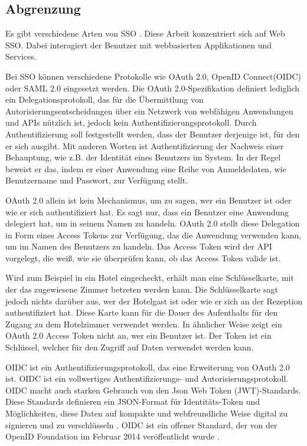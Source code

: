 \subsection{Abgrenzung} \label{EB_Abgrenzung}

Es gibt verschiedene Arten von SSO \cite{EB38}. Diese Arbeit konzentriert sich auf Web SSO. Dabei interagiert der Benutzer mit webbasierten Applikationen und Services.

Bei SSO können verschiedene Protokolle wie OAuth 2.0, OpenID Connect(OIDC) oder SAML 2.0 eingesetzt werden. Die OAuth 2.0-Spezifikation definiert lediglich ein Delegationsprotokoll, das für die Übermittlung von Autorisierungsentscheidungen über ein Netzwerk von webfähigen Anwendungen und APIs nützlich ist, jedoch kein Authentifizierungsprotokoll. Durch Authentifizierung soll festgestellt werden, dass der Benutzer derjenige ist, für den er sich ausgibt. Mit anderen Worten ist Authentifizierung der Nachweis einer Behauptung, wie z.B. der Identität eines Benutzers im System. In der Regel beweist er das, indem er einer Anwendung eine Reihe von Anmeldedaten, wie Benutzername und Passwort, zur Verfügung stellt. \cite{OAuth2inAction} \label{OAuthForAuthentication}

OAuth 2.0 allein ist kein Mechanismus, um zu sagen, wer ein Benutzer ist oder wie er sich authentifiziert hat. Es sagt nur, dass ein Benutzer eine Anwendung delegiert hat, um in seinem Namen zu handeln. OAuth 2.0 stellt diese Delegation in Form eines Access Tokens zur Verfügung, das die Anwendung verwenden kann, um im Namen des Benutzers zu handeln. Das Access Token wird der API vorgelegt, die weiß, wie sie überprüfen kann, ob das Access Token valide ist. \cite{AuthorizationvsAuthentication}

Wird zum Beispiel in ein Hotel eingecheckt, erhält man eine Schlüsselkarte, mit der das zugewiesene Zimmer betreten werden kann. Die Schlüsselkarte sagt jedoch nichts darüber aus, wer der Hotelgast ist oder wie er sich an der Rezeption authentifiziert hat. Diese Karte kann für die Dauer des Aufenthalts für den Zugang zu dem Hotelzimmer verwendet werden. In ähnlicher Weise zeigt ein OAuth 2.0 Access Token nicht an, wer ein Benutzer ist. Der Token ist ein Schlüssel, welcher für den Zugriff auf Daten verwendet werden kann. \cite{AuthorizationvsAuthentication}

OIDC ist ein Authentifizierungsprotokoll, das eine Erweiterung von OAuth 2.0 ist. OIDC ist ein vollwertiges Authentifizierungs- und Autorisierungsprotokoll. OIDC macht auch starken Gebrauch von den Json Web Token (JWT)-Standards. Diese Standards definieren ein JSON-Format für Identitäts-Token und Möglichkeiten, diese Daten auf kompakte und webfreundliche Weise digital zu signieren und zu verschlüsseln \cite{ssoProtocols}. OIDC ist ein offener Standard, der von der OpenID Foundation im Februar 2014 veröffentlicht wurde \cite{OAuth2inAction}.

